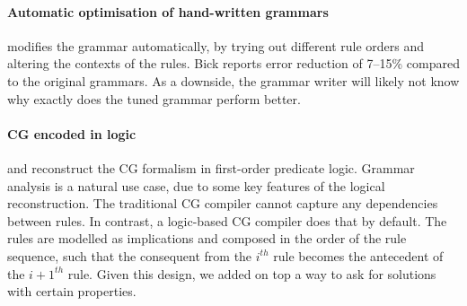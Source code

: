 \paragraph{Automatic optimisation of hand-written grammars }

 modifies the grammar automatically, by trying
out different rule orders and altering the contexts of the rules.
Bick reports error reduction of 7--15\% compared to the original grammars.
As a downside, the grammar writer will likely not know why exactly does the tuned grammar perform better.



\paragraph{CG encoded in logic}

 and  reconstruct the CG formalism in first-order predicate logic.
Grammar analysis is a natural use case, due to some key features of the logical reconstruction.
The traditional CG compiler 
 cannot capture any dependencies between rules.
In contrast, a logic-based CG compiler does that by default. 
The rules are modelled as implications and composed in the order of the rule sequence, such that 
the consequent from the $i^{th}$ rule becomes the antecedent of the $i+1^{th}$ rule.
Given this design, we added on top a way to ask for solutions with certain properties.


